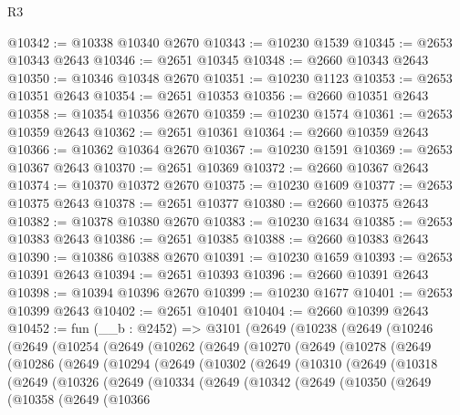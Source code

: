 \begin{lexlean}{R3}
\begin{coremodule}
@10342 := @10338 @10340 @2670
@10343 := @10230 @1539
@10345 := @2653 @10343 @2643
@10346 := @2651 @10345
@10348 := @2660 @10343 @2643
@10350 := @10346 @10348 @2670
@10351 := @10230 @1123
@10353 := @2653 @10351 @2643
@10354 := @2651 @10353
@10356 := @2660 @10351 @2643
@10358 := @10354 @10356 @2670
@10359 := @10230 @1574
@10361 := @2653 @10359 @2643
@10362 := @2651 @10361
@10364 := @2660 @10359 @2643
@10366 := @10362 @10364 @2670
@10367 := @10230 @1591
@10369 := @2653 @10367 @2643
@10370 := @2651 @10369
@10372 := @2660 @10367 @2643
@10374 := @10370 @10372 @2670
@10375 := @10230 @1609
@10377 := @2653 @10375 @2643
@10378 := @2651 @10377
@10380 := @2660 @10375 @2643
@10382 := @10378 @10380 @2670
@10383 := @10230 @1634
@10385 := @2653 @10383 @2643
@10386 := @2651 @10385
@10388 := @2660 @10383 @2643
@10390 := @10386 @10388 @2670
@10391 := @10230 @1659
@10393 := @2653 @10391 @2643
@10394 := @2651 @10393
@10396 := @2660 @10391 @2643
@10398 := @10394 @10396 @2670
@10399 := @10230 @1677
@10401 := @2653 @10399 @2643
@10402 := @2651 @10401
@10404 := @2660 @10399 @2643
@10452 := fun (__b : @2452) =>
  @3101
    (@2649
      (@10238
        (@2649
          (@10246
            (@2649
              (@10254
                (@2649
                  (@10262
                    (@2649
                      (@10270
                        (@2649
                          (@10278
                            (@2649
                              (@10286
                                (@2649
                                  (@10294
                                    (@2649
                                      (@10302
                                        (@2649
                                          (@10310
                                            (@2649
                                              (@10318
                                                (@2649
                                                  (@10326
                                                    (@2649
                                                      (@10334
                                                        (@2649
                                                          (@10342
                                                            (@2649
                                                              (@10350
                                                                (@2649
                                                                  (@10358
                                                                    (@2649
                                                                      (@10366

\end{coremodule}
\end{lexlean}
